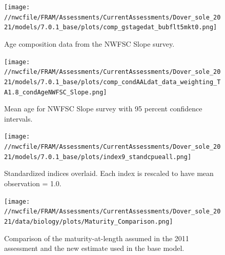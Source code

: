 \documentclass[11pt,
  english,
  a4paper,
]{article}
\begin{document}

\begin{figure}
\centering
\texttt{[image: //nwcfile/FRAM/Assessments/CurrentAssessments/Dover\_sole\_2021/models/7.0.1\_base/plots/comp\_gstagedat\_bubflt5mkt0.png]}
\caption{Age composition data from the NWFSC Slope survey.\label{fig:nw-slope-age-data}}
\end{figure}

\tagmcend\tagstructend


\begin{figure}
\centering
\texttt{[image: //nwcfile/FRAM/Assessments/CurrentAssessments/Dover\_sole\_2021/models/7.0.1\_base/plots/comp\_condAALdat\_data\_weighting\_TA1.8\_condAgeNWFSC\_Slope.png]}
\caption{Mean age for NWFSC Slope survey with 95 percent confidence intervals.\label{fig:mean-nw-slope-age-data}}
\end{figure}

\tagmcend\tagstructend


\begin{figure}
\centering
\texttt{[image: //nwcfile/FRAM/Assessments/CurrentAssessments/Dover\_sole\_2021/models/7.0.1\_base/plots/index9\_standcpueall.png]}
\caption{Standardized indices overlaid. Each index is rescaled to have mean observation = 1.0.\label{fig:index-compare}}
\end{figure}

\tagmcend\tagstructend


\begin{figure}
\centering
\texttt{[image: //nwcfile/FRAM/Assessments/CurrentAssessments/Dover\_sole\_2021/data/biology/plots/Maturity\_Comparison.png]}
\caption{Comparison of the maturity-at-length assumed in the 2011 assessment and the new estimate used in the base model.\label{fig:compare-mat-at-len}}
\end{figure}
\end{document}
